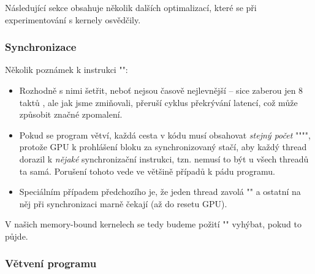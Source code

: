     Následující sekce obsahuje několik dalších optimalizací, které se při experimentování s kernely osvědčily. 

        \subsubsection{Synchronizace}

        Několik poznámek k instrukci \Vr"":
        \begin{itemize}
          \item Rozhodně s nimi šetřit, neboť nejsou časově nejlevnější -- sice zaberou jen 8 taktů \cite{CUDA programming g.}, ale jak jsme zmiňovali, přeruší cyklus překrývání latencí, což může způsobit značné zpomalení.
          \item Pokud se program větví, každá cesta v kódu musí obsahovat \emph{stejný počet} \Vr""\linebreak\Vr"", protože GPU k prohlášení bloku za synchronizovaný stačí, aby každý thread dorazil k \emph{nějaké} synchronizační instrukci, tzn. nemusí to být u všech threadů ta samá. Porušení tohoto vede ve většině případů k pádu programu.
          \item Speciálním případem předchozího je, že jeden thread zavolá \Vr"" a ostatní na něj při synchronizaci marně čekají (až do resetu GPU).
        \end{itemize}
        V našich memory-bound kernelech se tedy budeme požití \Vr"" vyhýbat, pokud to půjde.

        \subsubsection{Větvení programu}\label{větvení}

